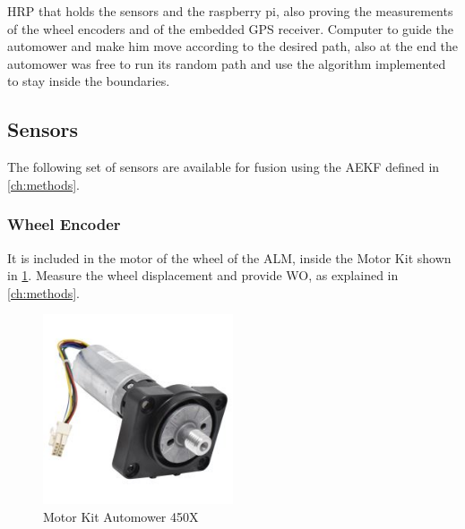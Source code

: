 \noindent
\gls{HRP} that holds the sensors and the raspberry pi, also proving the measurements of the wheel encoders and of the embedded GPS receiver.
Computer to guide the automower and make him move according to the desired path, also at the end the automower was free to run its random path and use the algorithm implemented to stay inside the boundaries.




\subsection{Sensors}
\label{ssec:sens}
\noindent
The following set of sensors are available for fusion using the \gls{AEKF} defined in \ref{ch:methods}.

\subsubsection{Wheel Encoder}
\noindent
It is included in the motor of the wheel of the \gls{ALM}, inside the Motor Kit shown in \ref{fig:wheelenc}.
Measure the wheel displacement and provide \gls{WO}, as explained in \ref{ch:methods}.

\begin{figure}[!ht]
	\begin{center}
		\includegraphics[width=0.5\textwidth]{Images/4-Methods/MotorEnc.jpeg}
	\end{center}
	\caption{Motor Kit Automower 450X }
	\label{fig:wheelenc}
\end{figure}

